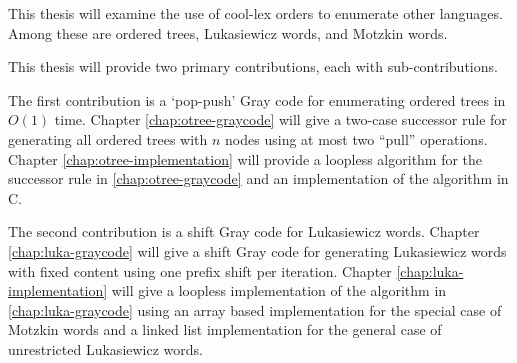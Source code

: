This thesis will examine the use of cool-lex orders to enumerate other languages. Among these are ordered trees, Lukasiewicz words, and Motzkin words. 

This thesis will provide two primary contributions, each with sub-contributions.  

The first contribution is a `pop-push' Gray code for enumerating ordered trees in $O(1)$ time. Chapter \ref{chap:otree-graycode} will give a two-case successor rule for generating all ordered trees with $n$ nodes using at most two ``pull'' operations. Chapter \ref{chap:otree-implementation} will provide a loopless algorithm for the successor rule in \ref{chap:otree-graycode} and an implementation of the algorithm in C.

The second contribution is a shift Gray code for Lukasiewicz words.  Chapter \ref{chap:luka-graycode} will give a shift Gray code for generating Lukasiewicz words with fixed content using one prefix shift per iteration.  Chapter \ref{chap:luka-implementation} will give a loopless implementation of the algorithm in \ref{chap:luka-graycode} using an array based implementation for the special case of Motzkin words and a linked list implementation for the general case of unrestricted Lukasiewicz words.
